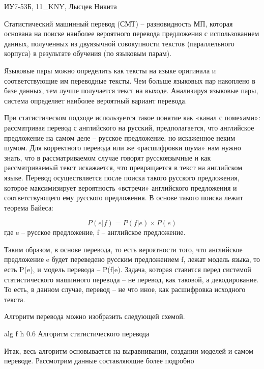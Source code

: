 \documentclass{bmstu}
\begin{document}
	ИУ7-53Б, 11\_KNY, Лысцев Никита
	
	Статистический машинный перевод (СМТ) -- разновидность МП, которая основана на поиске наиболее вероятного перевода предложения с использованием данных, полученных из двуязычной совокупности текстов (параллельного корпуса) в результате  обучения (по языковым парам)\cite{smt}.
	
	Языковые пары можно определить как тексты на языке оригинала и соответствующие им
	переводные тексты. Чем больше языковых пар накоплено в базе данных, тем
	лучше получается текст на выходе. Анализируя языковые пары, система
	определяет наиболее вероятный вариант перевода.
	
	При статистическом подходе используется такое понятие как «канал с
	помехами»\cite{smt}: рассматривая перевод с английского на
	русский, предполагается, что английское предложение на самом деле –
	русское предложение, но искаженное неким шумом. Для
	корректного перевода или же «расшифровки шума» нам нужно знать, что в
	рассматриваемом случае говорят русскоязычные и как рассматриваемый
	текст искажается, что превращается в текст на английском языке. Перевод
	осуществляется после поиска такого русского предложения, которое
	максимизирует вероятность «встречи» английского предложения и
	соответствующего ему русского предложения. В основе такого поиска лежит
	теорема Байеса:
	
	\begin{equation}
		\label{eq:L}
		P(e|f) = P(f|e) \times P(e)
	\end{equation}
	где e – русское предложение, f – английское предложение.
	
	Таким образом, в основе перевода, то есть вероятности того, что
	английское предложение e будет переведено русским предложением f, лежат
	модель языка, то есть P(e), и модель перевода – P(f|e). Задача, которая
	ставится перед системой статистического машинного перевода – не перевод,
	как таковой, а декодирование. То есть, в данном случае, перевод – не что
	иное, как расшифровка исходного текста. 
	
	Алгоритм перевода можно изобразить следующей схемой.
	
	{alg} %
	{f} %
	{h} %
	{0.6\textwidth} %
	{Алгоритм статистического перевода \cite{smt2}} %

	Итак, весь алгоритм основывается на выравнивании, создании моделей
	и самом переводе. Рассмотрим данные составляющие более подробно
	
\end{document}
